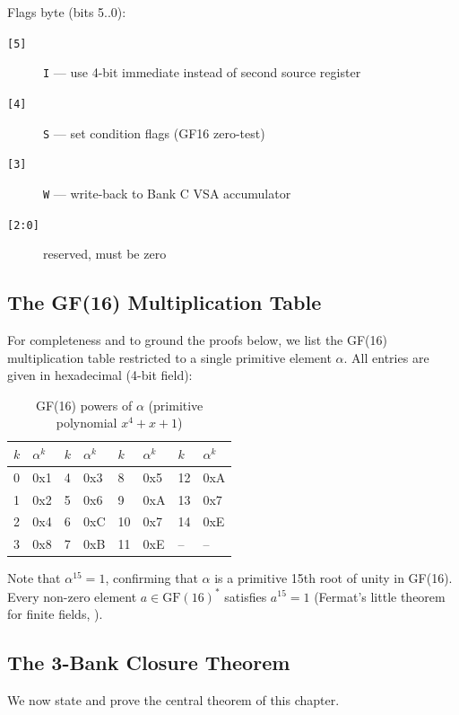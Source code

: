 \noindent Flags byte (bits 5..0):
\begin{description}
  \item[\texttt{[5]}] \texttt{I} — use 4-bit immediate instead of second source register
  \item[\texttt{[4]}] \texttt{S} — set condition flags (GF16 zero-test)
  \item[\texttt{[3]}] \texttt{W} — write-back to Bank C VSA accumulator
  \item[\texttt{[2:0]}] reserved, must be zero
\end{description}

\subsection{The GF(16) Multiplication Table}
\label{subsec:71:gf16-table}

For completeness and to ground the proofs below, we list the GF(16)
multiplication table restricted to a single primitive element $\alpha$.
All entries are given in hexadecimal (4-bit field):

\begin{table}[H]
\centering
\caption{GF(16) powers of $\alpha$ (primitive polynomial $x^4+x+1$)}
\label{tab:71:gf16-powers}
\small
\begin{tabular}{ll|ll|ll|ll}
\toprule
$k$ & $\alpha^k$ & $k$ & $\alpha^k$ & $k$ & $\alpha^k$ & $k$ & $\alpha^k$ \\
\midrule
0  & 0x1 & 4  & 0x3 & 8  & 0x5 & 12 & 0xA \\
1  & 0x2 & 5  & 0x6 & 9  & 0xA & 13 & 0x7 \\
2  & 0x4 & 6  & 0xC & 10 & 0x7 & 14 & 0xE \\
3  & 0x8 & 7  & 0xB & 11 & 0xE & -- & --  \\
\bottomrule
\end{tabular}
\end{table}

\noindent Note that $\alpha^{15} = 1$, confirming that $\alpha$ is a
primitive 15th root of unity in GF(16).  Every non-zero element
$a \in \mathrm{GF}(16)^*$ satisfies $a^{15} = 1$ (Fermat's little
theorem for finite fields, \cite{macwilliams1977theory}).

\subsection{The 3-Bank Closure Theorem}
\label{subsec:71:theorem}

We now state and prove the central theorem of this chapter.


